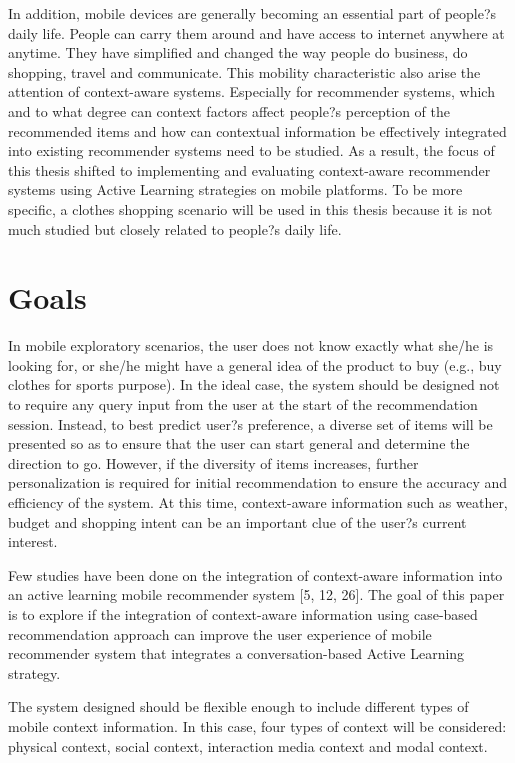 In addition, mobile devices are generally becoming an essential part of people?s daily life. People can carry them around and have access to internet anywhere at anytime. They have simplified and changed the way people do business, do shopping, travel and communicate. This mobility characteristic also arise the attention of context-aware systems. Especially for recommender systems, which and to what degree can context factors affect people?s perception of the recommended items and how can contextual information be effectively integrated into existing recommender systems need to be studied. As a result, the focus of this thesis shifted to implementing and evaluating context-aware recommender systems using Active Learning strategies on mobile platforms. To be more specific, a clothes shopping scenario will be used in this thesis because it is not much studied but closely related to people?s daily life.

\section{Goals} \label{sec:gl}

In mobile exploratory scenarios, the user does not know exactly what she/he is looking for, or she/he might have a general idea of the product to buy (e.g., buy clothes for sports purpose). In the ideal case, the system should be designed not to require any query input from the user at the start of the recommendation session. Instead, to best predict user?s preference, a diverse set of items will be presented so as to ensure that the user can start general and determine the direction to go. However, if the diversity of items increases, further personalization is required for initial recommendation to ensure the accuracy and efficiency of the system. At this time, context-aware information such as weather, budget and shopping intent can be an important clue of the user?s current interest. 

Few studies have been done on the integration of context-aware information into an active learning mobile recommender system [5, 12, 26]. The goal of this paper is to explore if the integration of context-aware information using case-based recommendation approach can improve the user experience of mobile recommender system that integrates a conversation-based Active Learning strategy.

The system designed should be flexible enough to include different types of mobile context information. In this case, four types of context will be considered: physical context, social context, interaction media context and modal context.

